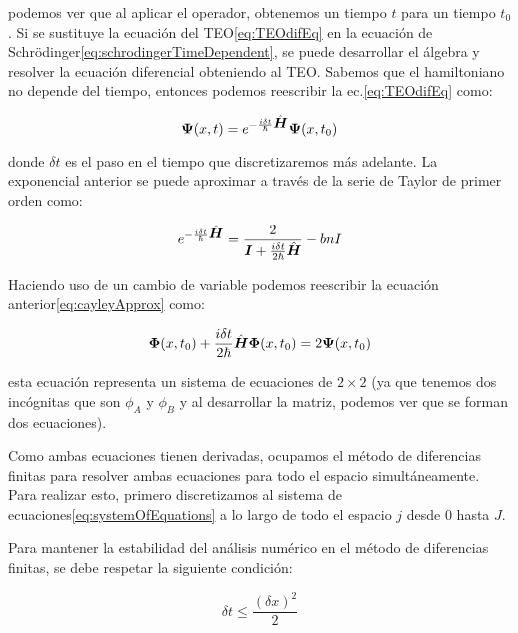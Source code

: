     \noindent podemos ver que al aplicar el operador, obtenemos un tiempo $t$ para un tiempo $t_0$.
    Si se sustituye la ecuación del TEO\eqref{eq:TEOdifEq} en la ecuación de Schrödinger\eqref{eq:schrodingerTimeDependent}, se puede desarrollar el álgebra y resolver la ecuación diferencial obteniendo al TEO\@.
    Sabemos que el hamiltoniano no depende del tiempo, entonces podemos reescribir la ec.\eqref{eq:TEOdifEq} como:
    
    \begin{equation}
        \label{eq:TEOApplied}
        \mbox{\boldmath $\Psi$}(x,t)= e^{-\frac{i\delta t}{\hbar}\hat{\mbox{\boldmath $H$}}} \mbox{\boldmath $\Psi$}(x,t_0)
    \end{equation}
    
    \noindent donde $\delta t$ es el paso en el tiempo que discretizaremos más adelante.
    La exponencial anterior se puede aproximar a través de la serie de Taylor de primer orden como:
    
    \begin{equation}
        \label{eq:cayleyApprox}
        e^{-\frac{i\delta t}{\hbar}\hat{\mbox{\boldmath $H$}}} = \frac{2}{\mbox{\boldmath $I$} + \frac{i\delta t}{2\hbar}\hat{\mbox{\boldmath $H$}}}-bn{I}
    \end{equation}

    Haciendo uso de un cambio de variable podemos reescribir la ecuación anterior\eqref{eq:cayleyApprox} como:

    \begin{equation}
        \label{eq:systemOfEquations}
        \mbox{\boldmath $\Phi$}(x,t_0) + \frac{i\delta t}{2\hbar}\hat{\mbox{\boldmath $H$}}\mbox{\boldmath $\Phi$}(x,t_0)=2\mbox{\boldmath $\Psi$}(x,t_0)
    \end{equation}

    \noindent esta ecuación representa un sistema de ecuaciones de $2\times2$ (ya que tenemos dos incógnitas que son $\phi_A$ y $\phi_B$ y al desarrollar la matriz, podemos ver que se forman dos ecuaciones).

    Como ambas ecuaciones tienen derivadas, ocupamos el método de diferencias finitas para resolver ambas ecuaciones para todo el espacio simultáneamente.
    Para realizar esto, primero discretizamos al sistema de ecuaciones\eqref{eq:systemOfEquations} a lo largo de todo el espacio $j$ desde $0$ hasta $J$.
    
    Para mantener la estabilidad del análisis numérico en el método de diferencias finitas, se debe respetar la siguiente condición\cite{Carrillo2015}:

    \begin{equation}
        \label{eq:stabilityCondition}
        \delta t \leq \frac{\left( \delta x \right)^2}{2}
    \end{equation}


